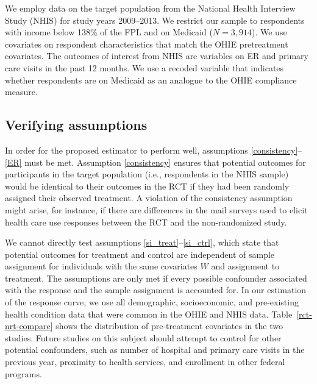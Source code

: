 \documentclass[12pt]{article}
\newcommand{\todo}[1]{{\color{red}{TO DO: \sc #1}}}
\begin{document}
We employ data on the target population from the National Health Interview Study (NHIS) \cite{NHIS} for study years 2009--2013.  We restrict our sample to respondents with income below 138\% of the FPL and on Medicaid ($N=3,914$). We use covariates on respondent characteristics that match the OHIE pretreatment covariates. The outcomes of interest from NHIS are variables on ER  and primary care visits in the past 12 months. We use a recoded variable that indicates whether respondents are on Medicaid as an analogue to the OHIE compliance measure.

\subsection{Verifying assumptions}

In order for the proposed estimator to perform well, assumptions \eqref{consistency}--\eqref{ER} must be met.  Assumption \eqref{consistency} ensures that potential outcomes for participants in the target population (i.e., respondents in the NHIS sample) would be identical to their outcomes in the RCT if they had been randomly assigned their observed treatment. A violation of the consistency assumption might arise, for instance, if there are differences in the mail surveys used to elicit health care use responses between the RCT and the non-randomized study. 

We cannot directly test assumptions \eqref{si_treat}--\eqref{si_ctrl}, which state that potential outcomes for treatment and control are independent of sample assignment for individuals with the same covariates $W$ and assignment to treatment.  The assumptions are only met if every possible confounder associated with the response and the sample assignment is accounted for.  In our estimation of the response curve, we use all demographic, socioeconomic, and pre-existing health condition data that were common in the OHIE and NHIS data.  Table~\ref{rct-nrt-compare} shows the distribution of pre-treatment covariates in the two studies.  \todo{Describe what is notable in the table, how it relates to confounding.}  Future studies on this subject should attempt to control for other potential confounders, such as number of hospital and primary care visits in the previous year, proximity to health services, and enrollment in other federal programs. \\
\end{document}
